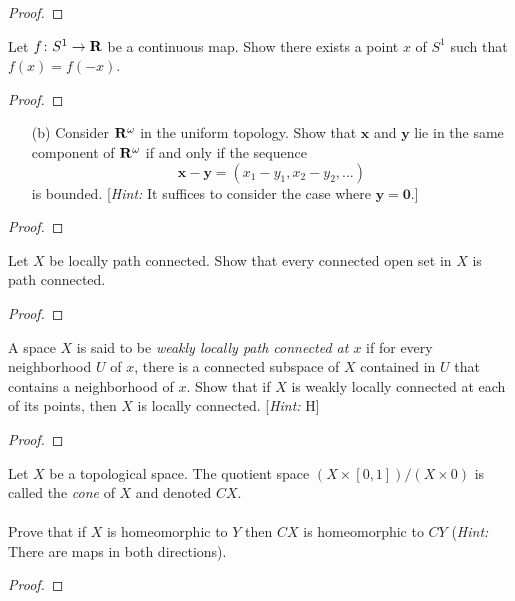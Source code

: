 \begin{proof}
\end{proof}
\newpage
\begin{problem}[Munkres \S24, Ex.\,2]
Let $f\colon S^1\to\mathbf{R}$ be a continuous map. Show there exists a
point $x$ of $S^1$ such that $f(x)=f(-x)$.
\end{problem}
\begin{proof}
\end{proof}
\newpage
\begin{problem}[Munkres \S25, Ex.\,2(b)]
\begin{enumerate}[noitemsep]
\item[(b)] Consider $\mathbf{R}^\omega$ in the uniform topology. Show
  that $\mathbf{x}$ and $\mathbf{y}$ lie in the same component of
  $\mathbf{R}^\omega$ if and only if the sequence
  \[
    \mathbf{x}-\mathbf{y}=(x_1-y_1,x_2-y_2,...)
  \]
  is bounded. [\emph{Hint:} It suffices to consider the case
  where $\mathbf{y}=\mathbf{0}$.]
\end{enumerate}
\end{problem}
\begin{proof}
\end{proof}
\newpage
\begin{problem}[Munkres \S25, Ex.\,4]
Let $X$ be locally path connected. Show that every connected open
set in $X$ is path connected.
\end{problem}
\begin{proof}
\end{proof}
\newpage
\begin{problem}[Munkres \S25, Ex.\,6]
A space $X$ is said to be \emph{weakly locally path connected at
  $x$} if for every neighborhood $U$ of $x$, there is a connected
subspace of $X$ contained in $U$ that contains a neighborhood of
$x$. Show that if $X$ is weakly locally connected at each of its
points, then $X$ is locally connected. [\emph{Hint:} H]
\end{problem}
\begin{proof}
\end{proof}
\newpage
\begin{problem}[A]
Let $X$ be a topological space. The quotient space
$(X\times[0,1])/(X\times 0)$ is called the \emph{cone} of $X$ and
denoted $CX$.
\\\\
Prove that if $X$ is homeomorphic to $Y$ then $CX$ is
homeomorphic to $CY$ (\emph{Hint:} There are maps in both
directions).
\end{problem}
\begin{proof}
\end{proof}
